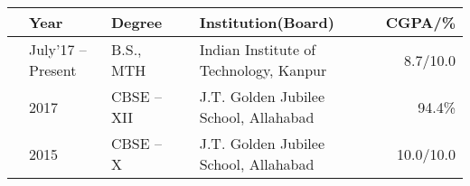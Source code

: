 
\newcommand{\education}[4]{
  & #1 & #2 & &#3 & #4
}
\begin{center}
\begin{tabular}{ | L{0.05cm} l | L{3cm} | L{0.05cm} C{8cm} | r |}
  \hline
  \education{\textbf{Year}}{\textbf{Degree}}{\textbf{Institution(Board)}}{\textbf{CGPA/\%}}\\
  \hline
  \education{July'17 -- Present}{B.S., MTH}{Indian Institute of Technology, Kanpur}{8.7/10.0}\\
  \education{2017}{CBSE -- XII}{J.T. Golden Jubilee School, Allahabad}{94.4\%}\\
  \education{2015}{CBSE -- X}{J.T. Golden Jubilee School, Allahabad}{10.0/10.0}\\
  \hline
\end{tabular}
\end{center}
\vspace{-4mm}
